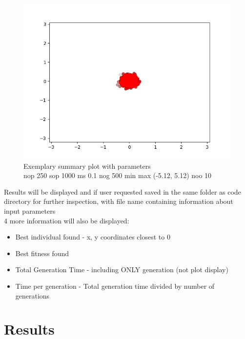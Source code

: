 \documentclass{article}[12pt]
\begin{document}
\begin{figure}[H]
    \caption{Exemplary summary plot with parameters\\ nop 250 sop 1000 ms 0.1 nog 500 min max (-5.12, 5.12) noo 10 }
    \includegraphics[width=\textwidth]{example_summary.jpg}
    \centering
    \end{figure}
Results will be displayed and if user requested saved in the same folder as code directory for further inspection, with file name containing information about input parameters \\
4 more information will also be displayed: 
\begin{itemize}
    \item Best individual found - x, y coordinates closest to 0
    \item Best fitness found
    \item Total Generation Time - including ONLY generation (not plot display)
    \item Time per generation - Total generation time divided by number of generations
\end{itemize}
\section{Results}
\end{document}
